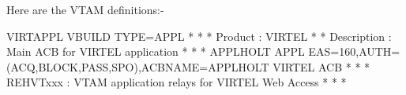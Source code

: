 \documentclass[letterpaper,10pt,english]{sphinxmanual}
\begin{document}
Here are the VTAM definitions:-

\begin{sphinxVerbatim}[commandchars=\\\{\}]
VIRTAPPL VBUILD TYPE=APPL
* \PYGZhy{}\PYGZhy{}\PYGZhy{}\PYGZhy{}\PYGZhy{}\PYGZhy{}\PYGZhy{}\PYGZhy{}\PYGZhy{}\PYGZhy{}\PYGZhy{}\PYGZhy{}\PYGZhy{}\PYGZhy{}\PYGZhy{}\PYGZhy{}\PYGZhy{}\PYGZhy{}\PYGZhy{}\PYGZhy{}\PYGZhy{}\PYGZhy{}\PYGZhy{}\PYGZhy{}\PYGZhy{}\PYGZhy{}\PYGZhy{}\PYGZhy{}\PYGZhy{}\PYGZhy{}\PYGZhy{}\PYGZhy{}\PYGZhy{}\PYGZhy{}\PYGZhy{}\PYGZhy{}\PYGZhy{}\PYGZhy{}\PYGZhy{}\PYGZhy{}\PYGZhy{}\PYGZhy{}\PYGZhy{}\PYGZhy{}\PYGZhy{}\PYGZhy{}\PYGZhy{}\PYGZhy{}\PYGZhy{}\PYGZhy{}\PYGZhy{}\PYGZhy{}\PYGZhy{}\PYGZhy{}\PYGZhy{}\PYGZhy{}\PYGZhy{}\PYGZhy{}\PYGZhy{}\PYGZhy{}\PYGZhy{}\PYGZhy{}\PYGZhy{}\PYGZhy{}\PYGZhy{}\PYGZhy{} *
* Product     :  VIRTEL                                              *
* Description :  Main ACB for VIRTEL application                     *
* \PYGZhy{}\PYGZhy{}\PYGZhy{}\PYGZhy{}\PYGZhy{}\PYGZhy{}\PYGZhy{}\PYGZhy{}\PYGZhy{}\PYGZhy{}\PYGZhy{}\PYGZhy{}\PYGZhy{}\PYGZhy{}\PYGZhy{}\PYGZhy{}\PYGZhy{}\PYGZhy{}\PYGZhy{}\PYGZhy{}\PYGZhy{}\PYGZhy{}\PYGZhy{}\PYGZhy{}\PYGZhy{}\PYGZhy{}\PYGZhy{}\PYGZhy{}\PYGZhy{}\PYGZhy{}\PYGZhy{}\PYGZhy{}\PYGZhy{}\PYGZhy{}\PYGZhy{}\PYGZhy{}\PYGZhy{}\PYGZhy{}\PYGZhy{}\PYGZhy{}\PYGZhy{}\PYGZhy{}\PYGZhy{}\PYGZhy{}\PYGZhy{}\PYGZhy{}\PYGZhy{}\PYGZhy{}\PYGZhy{}\PYGZhy{}\PYGZhy{}\PYGZhy{}\PYGZhy{}\PYGZhy{}\PYGZhy{}\PYGZhy{}\PYGZhy{}\PYGZhy{}\PYGZhy{}\PYGZhy{}\PYGZhy{}\PYGZhy{}\PYGZhy{}\PYGZhy{}\PYGZhy{}\PYGZhy{} *
APPLHOLT APPL  EAS=160,AUTH=(ACQ,BLOCK,PASS,SPO),ACBNAME=APPLHOLT               \PYGZlt{}\PYGZhy{}\PYGZhy{}\PYGZhy{}\PYGZhy{} VIRTEL ACB
* \PYGZhy{}\PYGZhy{}\PYGZhy{}\PYGZhy{}\PYGZhy{}\PYGZhy{}\PYGZhy{}\PYGZhy{}\PYGZhy{}\PYGZhy{}\PYGZhy{}\PYGZhy{}\PYGZhy{}\PYGZhy{}\PYGZhy{}\PYGZhy{}\PYGZhy{}\PYGZhy{}\PYGZhy{}\PYGZhy{}\PYGZhy{}\PYGZhy{}\PYGZhy{}\PYGZhy{}\PYGZhy{}\PYGZhy{}\PYGZhy{}\PYGZhy{}\PYGZhy{}\PYGZhy{}\PYGZhy{}\PYGZhy{}\PYGZhy{}\PYGZhy{}\PYGZhy{}\PYGZhy{}\PYGZhy{}\PYGZhy{}\PYGZhy{}\PYGZhy{}\PYGZhy{}\PYGZhy{}\PYGZhy{}\PYGZhy{}\PYGZhy{}\PYGZhy{}\PYGZhy{}\PYGZhy{}\PYGZhy{}\PYGZhy{}\PYGZhy{}\PYGZhy{}\PYGZhy{}\PYGZhy{}\PYGZhy{}\PYGZhy{}\PYGZhy{}\PYGZhy{}\PYGZhy{}\PYGZhy{}\PYGZhy{}\PYGZhy{}\PYGZhy{}\PYGZhy{}\PYGZhy{}\PYGZhy{} *
* REHVTxxx    : VTAM application relays for VIRTEL Web Access        *
* \PYGZhy{}\PYGZhy{}\PYGZhy{}\PYGZhy{}\PYGZhy{}\PYGZhy{}\PYGZhy{}\PYGZhy{}\PYGZhy{}\PYGZhy{}\PYGZhy{}\PYGZhy{}\PYGZhy{}\PYGZhy{}\PYGZhy{}\PYGZhy{}\PYGZhy{}\PYGZhy{}\PYGZhy{}\PYGZhy{}\PYGZhy{}\PYGZhy{}\PYGZhy{}\PYGZhy{}\PYGZhy{}\PYGZhy{}\PYGZhy{}\PYGZhy{}\PYGZhy{}\PYGZhy{}\PYGZhy{}\PYGZhy{}\PYGZhy{}\PYGZhy{}\PYGZhy{}\PYGZhy{}\PYGZhy{}\PYGZhy{}\PYGZhy{}\PYGZhy{}\PYGZhy{}\PYGZhy{}\PYGZhy{}\PYGZhy{}\PYGZhy{}\PYGZhy{}\PYGZhy{}\PYGZhy{}\PYGZhy{}\PYGZhy{}\PYGZhy{}\PYGZhy{}\PYGZhy{}\PYGZhy{}\PYGZhy{}\PYGZhy{}\PYGZhy{}\PYGZhy{}\PYGZhy{}\PYGZhy{}\PYGZhy{}\PYGZhy{}\PYGZhy{}\PYGZhy{}\PYGZhy{}\PYGZhy{} *

\end{sphinxVerbatim}
\end{document}

